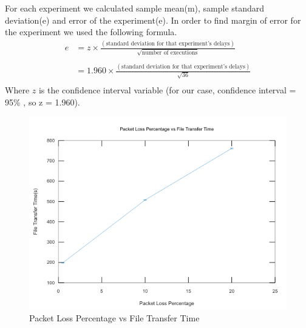 \documentclass[conference]{IEEEtran}
\begin{document}
For each experiment we calculated sample mean(m), sample standard deviation(e) and error of the experiment(e). In order to find margin of error for the experiment we used the following formula. \\
\begin{align*}
 e &= z \times \frac{(\text{standard deviation for that experiment's delays})}{\sqrt{\text{number of executions}}}  \\\\
   &= 1.960 \times \frac{(\text{standard deviation for that experiment's delays})}{\sqrt{36}} \\
\end{align*}
Where $z$ is the confidence interval variable (for our case, confidence interval = 95\% , so z = 1.960). 

\begin{figure}[h]
    \centering
    \includegraphics[scale=0.45]{graph1.png}
    \caption{Packet Loss Percentage vs File Transfer Time}
\end{figure}
\end{document}
